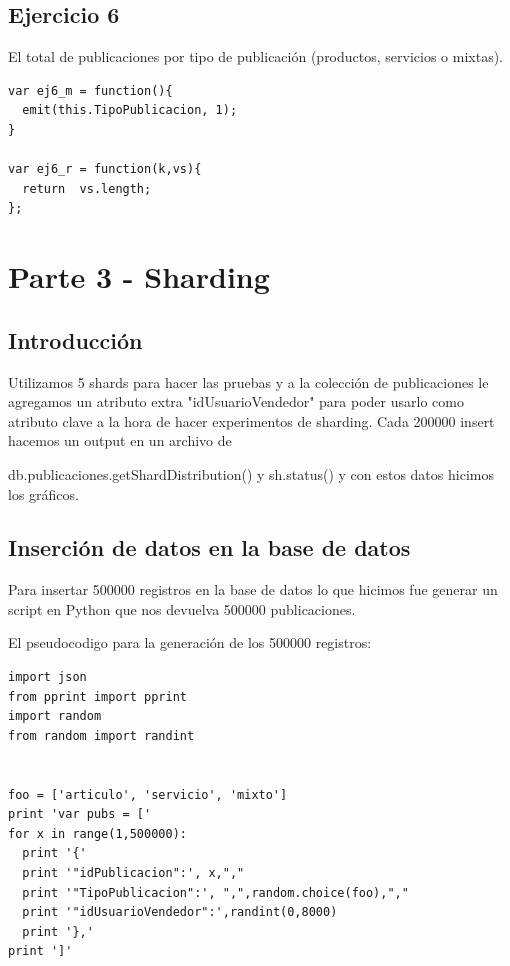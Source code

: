 \documentclass[a4paper, 10pt, twoside]{article}
\begin{document}
\subsection{Ejercicio 6}
El total de publicaciones por tipo de publicaci\'on (productos, servicios o mixtas).

\begin{lstlisting}[caption=Ejercicio 6]
var ej6_m = function(){
  emit(this.TipoPublicacion, 1);
}

var ej6_r = function(k,vs){
  return  vs.length;
};
\end{lstlisting}
\section{Parte 3 - Sharding}
\subsection{Introducci\'on}

Utilizamos 5 shards para hacer las pruebas y a la colecci\'on de publicaciones le agregamos un atributo extra "idUsuarioVendedor" para poder usarlo como atributo clave a la hora de hacer experimentos de sharding.
Cada 200000 insert hacemos un output en un archivo de 

db.publicaciones.getShardDistribution() y sh.status() y con estos datos hicimos los gr\'aficos.


\subsection{Inserci\'on de datos en la base de datos}
Para insertar 500000 registros en la base de datos lo que hicimos fue generar un script en Python que nos devuelva 500000 publicaciones. 

El pseudocodigo para la generaci\'on de los 500000 registros:
\begin{verbatim}
import json
from pprint import pprint
import random
from random import randint


foo = ['articulo', 'servicio', 'mixto']
print 'var pubs = ['
for x in range(1,500000):
  print '{'
  print '"idPublicacion":', x,","
  print '"TipoPublicacion":', ",",random.choice(foo),","
  print '"idUsuarioVendedor":',randint(0,8000)
  print '},'
print ']'

\end{verbatim}
\end{document}
